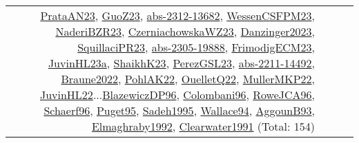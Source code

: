 {\begin{longtable}{p{3cm}r>{\raggedright\arraybackslash}p{6cm}>{\raggedright\arraybackslash}p{6cm}>{\raggedright\arraybackslash}p{8cm}}
& \hyperref[detail:PrataAN23]{PrataAN23}, \hyperref[detail:GuoZ23]{GuoZ23}, \hyperref[detail:abs-2312-13682]{abs-2312-13682}, \hyperref[detail:WessenCSFPM23]{WessenCSFPM23}, \hyperref[detail:NaderiBZR23]{NaderiBZR23}, \hyperref[detail:CzerniachowskaWZ23]{CzerniachowskaWZ23}, \hyperref[detail:Danzinger2023]{Danzinger2023}, \hyperref[detail:SquillaciPR23]{SquillaciPR23}, \hyperref[detail:abs-2305-19888]{abs-2305-19888}, \hyperref[detail:FrimodigECM23]{FrimodigECM23}, \hyperref[detail:JuvinHL23a]{JuvinHL23a}, \hyperref[detail:ShaikhK23]{ShaikhK23}, \hyperref[detail:PerezGSL23]{PerezGSL23}, \hyperref[detail:abs-2211-14492]{abs-2211-14492}, \hyperref[detail:Braune2022]{Braune2022}, \hyperref[detail:PohlAK22]{PohlAK22}, \hyperref[detail:OuelletQ22]{OuelletQ22}, \hyperref[detail:MullerMKP22]{MullerMKP22}, \hyperref[detail:JuvinHL22]{JuvinHL22}...\hyperref[detail:BlazewiczDP96]{BlazewiczDP96}, \hyperref[detail:Colombani96]{Colombani96}, \hyperref[detail:RoweJCA96]{RoweJCA96}, \hyperref[detail:Schaerf96]{Schaerf96}, \hyperref[detail:Puget95]{Puget95}, \hyperref[detail:Sadeh1995]{Sadeh1995}, \hyperref[detail:Wallace94]{Wallace94}, \hyperref[detail:AggounB93]{AggounB93}, \hyperref[detail:Elmaghraby1992]{Elmaghraby1992}, \hyperref[detail:Clearwater1991]{Clearwater1991} (Total: 154)\\

\end{longtable}}
